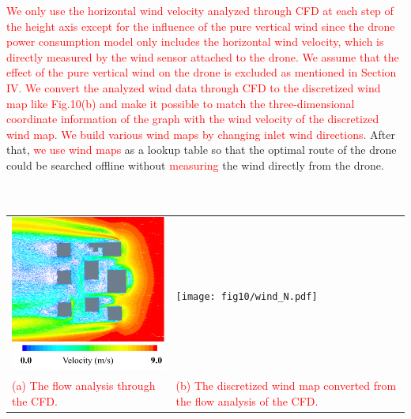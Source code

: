 \documentclass[onecolumn]{IEEEconf}
\begin{document}
\begin{description}
\begin{mdframed}[ linewidth=.75pt, userdefinedwidth=0.9\textwidth]
    \noindent\textcolor{red}{
    We only use the horizontal wind velocity analyzed through CFD at each step of the height axis except for the influence of the pure vertical wind since the drone power consumption model only includes the horizontal wind velocity, which is directly measured by the wind sensor attached to the drone. 
    We assume that the effect of the pure vertical wind on the drone is excluded as mentioned in Section IV.
    We convert the analyzed wind data through CFD to the discretized wind map like Fig.10(b) and make it possible to match the three-dimensional coordinate information of the graph with the wind velocity of the discretized wind map.
    We build various wind maps by changing inlet wind directions.}
    After that, \textcolor{red}{we use wind maps} as a lookup table so that the optimal route of the drone could be searched offline without \textcolor{red}{measuring} the wind directly from the drone.
    \\~\\
    ~\par
    \centering
    \setcounter{figure}{9}
    \begin{tabular}{m{}m{}}
        \includegraphics[scale=0.59]{fig10/CFD_map.pdf} &  \texttt{[image: fig10/wind\_N.pdf]} \\
        \small \textcolor{red}{(a) The flow analysis through the CFD.} &
        \small \textcolor{red}{(b) The discretized wind map converted from the flow analysis of the CFD.} \\

\end{tabular}
\end{mdframed}
\end{description}
\end{document}
